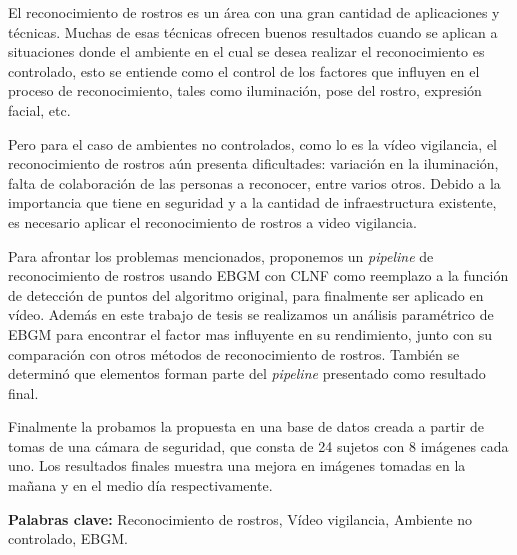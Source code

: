 \begin{resumen}
El reconocimiento de rostros es un área con una gran cantidad de aplicaciones y técnicas. 
Muchas de esas técnicas ofrecen buenos resultados cuando se aplican a situaciones donde el ambiente en el cual se desea realizar el reconocimiento es controlado, esto se entiende como el control de los factores que influyen en el proceso de reconocimiento, tales como iluminación, pose del rostro, expresión facial, etc.

Pero para el caso de ambientes no controlados, como lo es la vídeo vigilancia, el reconocimiento de rostros aún presenta dificultades: variación en la iluminación, falta de colaboración de las personas a reconocer, entre varios otros.
Debido a la importancia que tiene en seguridad y a la cantidad de infraestructura existente, es necesario aplicar el reconocimiento de rostros a video vigilancia.

Para afrontar los problemas mencionados, proponemos un \textit{pipeline} de reconocimiento de rostros usando \ac{EBGM} con \ac{CLNF} como reemplazo a la función de detección de puntos del algoritmo original, para finalmente ser aplicado en vídeo. 
Además en este trabajo de tesis se realizamos un análisis paramétrico de \ac{EBGM} para encontrar el factor mas influyente en su rendimiento, junto con su comparación con otros métodos de reconocimiento de rostros. También se determinó que elementos forman parte del \textit{pipeline} presentado como resultado final.

Finalmente la probamos la propuesta en una base de datos creada a partir de tomas de una cámara de seguridad, que consta de 24 sujetos con 8 imágenes cada uno. Los resultados finales muestra una mejora en imágenes tomadas en la mañana y en el medio día respectivamente.

\begin{flushleft}
\textbf{Palabras clave:} Reconocimiento de rostros, Vídeo vigilancia, Ambiente no controlado, \acf{EBGM}.
\end{flushleft}

\end{resumen}
